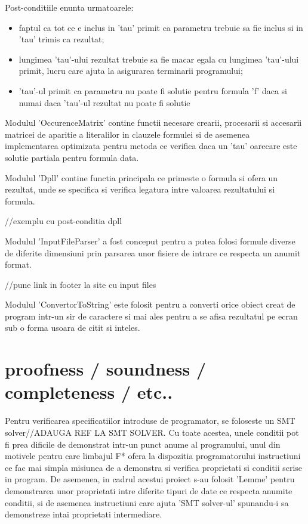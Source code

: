 {Post-conditiile enunta urmatoarele: 
\begin{itemize}
	\item  faptul ca tot ce e inclus in 'tau' primit ca parametru trebuie sa fie inclus si in 'tau' trimis ca rezultat; 
	
	\item lungimea 'tau'-ului rezultat trebuie sa fie macar egala cu lungimea 'tau'-ului primit, lucru care ajuta la asigurarea terminarii programului;
	
	\item 'tau'-ul primit ca parametru nu poate fi solutie pentru formula 'f' daca si numai daca 'tau'-ul rezultat nu poate fi solutie
\end{itemize}

Modulul 'OccurenceMatrix' contine functii necesare crearii, procesarii si accesarii matricei de aparitie a literalilor in clauzele formulei si de asemenea implementarea optimizata pentru metoda ce verifica daca un 'tau' oarecare este solutie partiala pentru formula data.

Modulul 'Dpll' contine functia principala ce primeste o formula si ofera un rezultat, unde se specifica si verifica legatura intre valoarea rezultatului si formula.

//exemplu cu post-conditia dpll

Modulul 'InputFileParser' a fost conceput pentru a putea folosi formule diverse de diferite dimensiuni prin parsarea unor fisiere de intrare ce respecta un anumit format.

//pune link in footer la site cu input files

 Modulul 'ConvertorToString' este folosit pentru a converti orice obiect creat de program intr-un sir de caractere si mai ales pentru a se afisa rezultatul pe ecran sub o forma usoara de citit si inteles.


\section{proofness / soundness / completeness / etc..}


Pentru verificarea specificatiilor introduse de programator, se foloseste un SMT solver//ADAUGA REF LA SMT SOLVER. Cu toate acestea, unele conditii pot fi prea dificile de demonstrat intr-un punct anume al programului, unul din motivele pentru care limbajul F* ofera la dispozitia programatorului instructiuni ce fac mai simpla misiunea de a demonstra si verifica proprietati si conditii scrise in program. De asemenea, in cadrul acestui proiect s-au folosit 'Lemme' pentru demonstrarea unor proprietati intre diferite tipuri de date ce respecta anumite conditii, si de asemenea instructiuni care ajuta 'SMT solver-ul' spunandu-i sa demonstreze intai proprietati intermediare.

}

